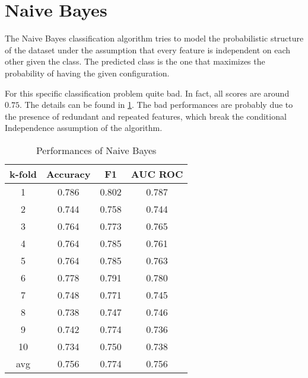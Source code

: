 \section{Naive Bayes}
\label{sec:naive_bayes}

The Naive Bayes classification algorithm tries to model the probabilistic structure of the dataset under the assumption that every feature is independent on each other given the class.
The predicted class is the one that maximizes the probability of having the given configuration.

For this specific classification problem quite bad.
In fact, all scores are around $0.75$.
The details can be found in \cref{tab:naive_bayes}.
The bad performances are probably due to the presence of redundant and repeated features, which break the conditional Independence assumption of the algorithm.

\begin{table}
	\centering
	\caption{Performances of Naive Bayes}
	\label{tab:naive_bayes}
	\begin{tabular}{cccc}
		\toprule
			\multicolumn{1}{c}{k-fold} &
			\multicolumn{1}{c}{Accuracy} &
			\multicolumn{1}{c}{F1} &
			\multicolumn{1}{c}{AUC ROC} \\
		\midrule
			  1  & 0.786 & 0.802 & 0.787 \\
			  2  & 0.744 & 0.758 & 0.744 \\
			  3  & 0.764 & 0.773 & 0.765 \\
			  4  & 0.764 & 0.785 & 0.761 \\
			  5  & 0.764 & 0.785 & 0.763 \\
			  6  & 0.778 & 0.791 & 0.780 \\
			  7  & 0.748 & 0.771 & 0.745 \\
			  8  & 0.738 & 0.747 & 0.746 \\
			  9  & 0.742 & 0.774 & 0.736 \\
			 10  & 0.734 & 0.750 & 0.738 \\[2pt]
			\hline
			 avg & 0.756 & 0.774 & 0.756 \Tstrut\Bstrut\\
		\bottomrule
	\end{tabular}
\end{table}
